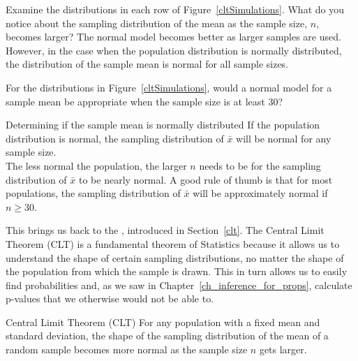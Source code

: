 \begin{examplewrap}
\begin{nexample}
{Examine the distributions in each row of Figure~\ref{cltSimulations}. What do you notice about the sampling distribution of the mean as the sample size, $n$, becomes larger?}
The normal model becomes better as larger samples are used. However, in the case when the population distribution is normally distributed, the distribution of the sample mean is normal for all sample sizes.
\end{nexample}
\end{examplewrap}

\begin{exercisewrap}
\begin{nexercise}For the distributions in Figure~\ref{cltSimulations}, would a normal model for a sample mean be appropriate when the sample size is at least 30?\footnotemark
\end{nexercise}
\end{exercisewrap}

\begin{onebox}{Determining if the sample mean is normally distributed}
If the population distribution is normal, the sampling distribution of $\bar{x}$ will be normal for any sample size. \\[2mm]
The less normal the population, the larger $n$ needs to be for the sampling distribution of $\bar{x}$ to be nearly normal. A good rule of thumb is that for most populations, the sampling distribution of $\bar{x}$ will be approximately normal if $n \ge 30$.\end{onebox}

This brings us back to the , introduced in Section~\ref{clt}.  The Central Limit Theorem (CLT) is a fundamental theorem of Statistics because it allows us to understand the shape of certain sampling distributions, no matter the shape of the population from which the sample is drawn.  This in turn allows us to easily find probabilities and, as we saw in Chapter~\ref{ch_inference_for_props}, calculate p-values that we otherwise would not be able to.


\begin{onebox}{Central Limit Theorem (CLT)}
For any population with a fixed mean and standard deviation, the shape of the sampling distribution of the mean of a random sample becomes more normal as the sample size $n$ gets larger.
\end{onebox}

